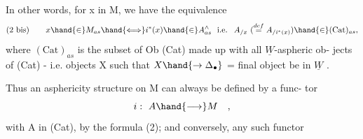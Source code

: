 In other words, for x in M,  we have the equivalence
\[ \text{(2 bis)} \qquad x \hand{\in} M_{as} \hand{\Longleftrightarrow} i^{*}(x) \hand{\in} A^{\wedge}_{as} \ \text{ i.e. } \ A_{/x}\ (\overset{def}{=} A_{/i^{*}(x)}) \hand{\in} (\text{Cat})_{as} , \]
where $(\text{Cat})_{as}$ is the subset of Ob (Cat) made up with all $\underline{W}$-aspheric ob-%
jects of (Cat)  -  i.e. objects X such that  $X \hand{\to \Delta_{\bullet}}$ \hand{(}= final object\hand{)}
be in $\underline{W}$ .

Thus an asphericity structure on M can always be defined by a func-%
tor  
\[ i:\ A \hand{\longrightarrow} M \quad , \]
with A in (Cat),  by the formula  (2);  and conversely,  any such functor

